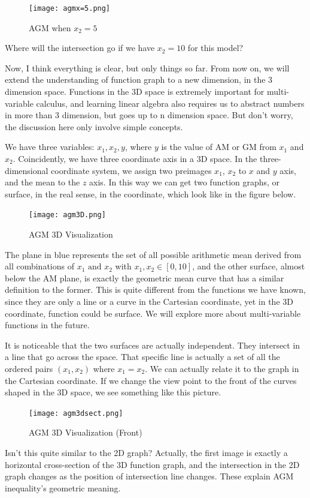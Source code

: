\documentclass[
	12pt, %
	fleqn, %
	a4paper, %
]{LegrandOrangeBook}
\begin{document}
\begin{figure}
    \centering
    \texttt{[image: agmx=5.png]}
    \caption{AGM when $x_2 = 5$}
\end{figure}

\begin{problem}
    Where will the intersection go if we have $x_2 = 10$ for this model?
\end{problem}

Now, I think everything is clear, but only things so far. From now on, we will extend the understanding of function graph to a new
dimension, in the 3 dimension space. Functions in the 3D space is extremely important for multi-variable calculus, and learning linear 
algebra also requires us to abstract numbers in more than 3 dimension, but goes up to n dimension space. But don't worry, the discussion
here only involve simple concepts. 

We have three variables: $x_1, x_2, y$, where $y$ is the value of AM or GM from $x_1$ and $x_2$. Coincidently, we have three coordinate
axis in a 3D space. In the three-dimensional coordinate system, we assign two preimages $x_1$, $x_2$ to $x$ and $y$ axis, and the mean
to the $z$ axis. In this way we can get two function graphs, or surface, in the real sense, in the coordinate, which look like in the 
figure below.
\begin{figure}[H]
    \centering
    \texttt{[image: agm3D.png]}
    \caption{AGM 3D Visualization}
\end{figure}

The plane in blue represents the set of all possible arithmetic mean derived from all combinations of $x_1 \text{ and }x_2$ with $x_1,x_2\in [0,10]$, and the other 
surface, almost below the AM plane, is exactly the geometric mean curve that has a similar definition to the former. This is quite different from the functions
we have known, since they are only a line or a curve in the Cartesian coordinate, yet in the 3D coordinate, function could be surface. We will explore more
about multi-variable functions in the future. 

It is noticeable that the two surfaces are actually independent. They intersect in a line that go across the space. That specific line is actually a set of all the
ordered pairs $(x_1,x_2)$ where $x_1 = x_2$. We can actually relate it to the graph in the Cartesian coordinate. If we change the view point to the front of the
curves shaped in the 3D space, we see something like this picture.
\begin{figure}[H]
    \centering
    \texttt{[image: agm3dsect.png]}
    \caption{AGM 3D Visualization (Front)}
\end{figure}
Isn't this quite similar to the 2D graph? Actually, the first image is exactly a horizontal cross-section of the 3D function graph, and the intersection in the 2D 
graph changes as the position of intersection line changes. These explain AGM inequality's geometric meaning.
\end{document}
